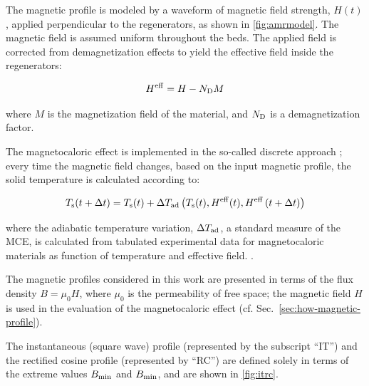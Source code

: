 \documentclass[referee]{svjour3}
\begin{document}
The magnetic profile is modeled by a waveform of magnetic field strength, $H(t)$, applied perpendicular to the regenerators, as shown in \autoref{fig:amrmodel}. The magnetic field is assumed uniform throughout the beds. The applied field is corrected from demagnetization effects to yield the effective field inside the regenerators:

\begin{equation}
  \label{eq:6}
  H^{\mathrm{eff}} = H - N_{\mathrm{D}} M
\end{equation}


\noindent where $M$ is the magnetization field of the material, and $N_{\mathrm{D}}$ is a demagnetization factor.

The magnetocaloric effect is implemented in the so-called discrete approach \cite{bib:nielsen11_review}; every time the magnetic field changes, based on the input magnetic profile, the solid temperature is calculated according to:

\begin{equation}
  \label{eq:89}
  T_{\mathrm{s}}(t + \Delta{}t) = T_{\mathrm{s}}(t) + \Delta{}T_{\mathrm{ad}} \left(T_{\mathrm{s}}(t),H^{\mathrm{eff}}(t),H^{\mathrm{eff}}\left(t + \Delta{}t\right)\right)
\end{equation}



\noindent where the adiabatic temperature variation, $\Delta{}T_{\mathrm{ad}}$, a standard measure of the MCE, is calculated from tabulated experimental data for magnetocaloric materials as function of temperature and effective field. \cite{bib:trevizoli16_perfor_model}.

The magnetic profiles considered in this work are presented in terms of the flux density $B = \mu_0 H$, where $\mu_0$ is the permeability of free space; the magnetic field $H$ is used in the evaluation of the magnetocaloric effect (cf. Sec.~\ref{sec:how-magnetic-profile}).

The instantaneous (square wave) profile (represented by the subscript ``IT'') and the rectified cosine profile (represented by ``RC'') are defined solely in terms of the extreme values $B_{\mathrm{min}}$ and $B_{\mathrm{min}}$, and are shown in \autoref{fig:itrc}.

\end{document}
